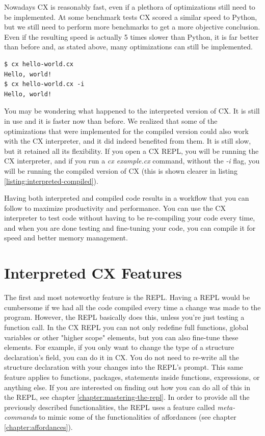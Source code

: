 \documentclass[11pt,fleqn,openany]{book} %
\begin{document}
Nowadays CX is reasonably fast, even if a plethora of optimizations still need to be implemented. At some benchmark tests CX scored a similar speed to Python, but we still need to perform more benchmarks to get a more objective conclusion. Even if the resulting speed is actually 5 times slower than Python, it is far better than before and, as stated above, many optimizations can still be implemented.

\begin{lstlisting}[caption={Interpreting and compiling the same program},captionpos=b,label={listing:interpreted-compiled}]
$ cx hello-world.cx
Hello, world!
$ cx hello-world.cx -i
Hello, world!
\end{lstlisting}

You may be wondering what happened to the interpreted version of CX. It is still in use and it is faster now than before. We realized that some of the optimizations that were implemented for the compiled version could also work with the CX interpreter, and it did indeed benefited from them. It is still slow, but it retained all its flexibility. If you open a CX REPL, you will be running the CX interpreter, and if you run a \emph{cx example.cx} command, without the \emph{-i} flag, you will be running the compiled version of CX (this is shown clearer in listing \ref{listing:interpreted-compiled}).

Having both interpreted and compiled code results in a workflow that you can follow to maximize productivity and performance. You can use the CX interpreter to test code without having to be re-compiling your code every time, and when you are done testing and fine-tuning your code, you can compile it for speed and better memory management.

\section{Interpreted CX Features}

The first and most noteworthy feature is the REPL. Having a REPL would be cumbersome if we had all the code compiled every time a change was made to the program. However, the REPL basically does this, unless you're just testing a function call. In the CX REPL you can not only redefine full functions, global variables or other "higher scope" elements, but you can also fine-tune these elements. For example, if you only want to change the type of a structure declaration's field, you can do it in CX. You do not need to re-write all the structure declaration with your changes into the REPL's prompt. This same feature applies to functions, packages, statements inside functions, expressions, or anything else. If you are interested on finding out how you can do all of this in the REPL, see chapter \ref{chapter:mastering-the-repl}. In order to provide all the previously described functionalities, the REPL uses a feature called \emph{meta-commands} to mimic some of the functionalities of affordances (see chapter \ref{chapter:affordances}). 
\end{document}
